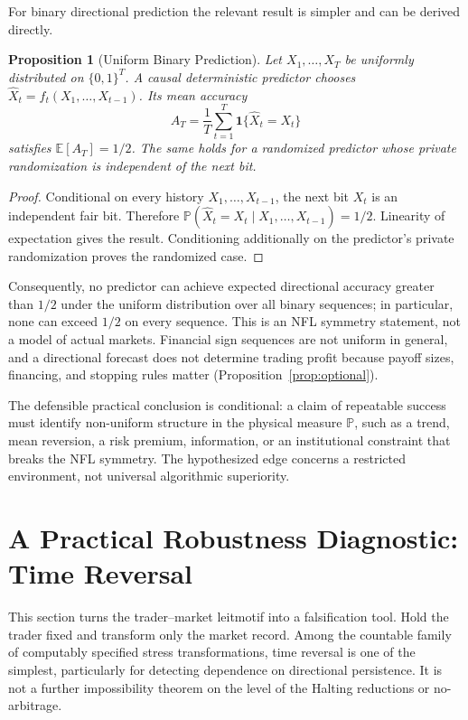 \documentclass[aps,pra,reprint,superscriptaddress,amsmath,amssymb,floatfix]{revtex4-2}
\theoremstyle{plain}
\newtheorem{proposition}[theorem]{Proposition}
\theoremstyle{definition}
\theoremstyle{remark}
\begin{document}
For binary directional prediction the relevant result is simpler and can be
derived directly.

\begin{proposition}[Uniform Binary Prediction]
  \label{prop:binary}
  Let \(X_1,\ldots,X_T\) be uniformly distributed on \(\{0,1\}^T\). A causal
  deterministic predictor chooses
  \(\widehat X_t=f_t(X_1,\ldots,X_{t-1})\). Its mean accuracy
  \[
    A_T=\frac1T\sum_{t=1}^T
      \mathbf{1}\{\widehat X_t=X_t\}
  \]
  satisfies \(\mathbb{E}[A_T]=1/2\). The same holds for a randomized predictor
  whose private randomization is independent of the next bit.
\end{proposition}

\begin{proof}
Conditional on every history \(X_1,\ldots,X_{t-1}\), the next bit \(X_t\) is
an independent fair bit. Therefore
\(\mathbb{P}(\widehat X_t=X_t\mid X_1,\ldots,X_{t-1})=1/2\).
Linearity of expectation gives the result. Conditioning additionally on the
predictor's private randomization proves the randomized case.
\end{proof}

Consequently, no predictor can achieve expected directional accuracy greater
than \(1/2\) under the uniform distribution over all binary sequences; in
particular, none can exceed \(1/2\) on every sequence. This is an NFL symmetry
statement, not a model of actual markets. Financial sign sequences are not
uniform in general, and a directional forecast does not determine trading
profit because payoff sizes, financing, and stopping rules matter
(Proposition~\ref{prop:optional}).

The defensible practical conclusion is conditional: a claim of repeatable
success must identify non-uniform structure in the physical measure
\(\mathbb{P}\), such as a trend, mean reversion, a risk premium, information,
or an institutional constraint that breaks the NFL symmetry. The hypothesized
edge concerns a restricted environment, not universal algorithmic
superiority.

\section{A Practical Robustness Diagnostic: Time Reversal}
\label{sec:criterion}

This section turns the trader--market leitmotif into a falsification tool. Hold
the trader fixed and transform only the market record. Among the countable
family of computably specified stress transformations, time reversal is one of
the simplest, particularly for detecting dependence on directional
persistence. It is not a further impossibility theorem on the level of the
Halting reductions or no-arbitrage.
\end{document}

